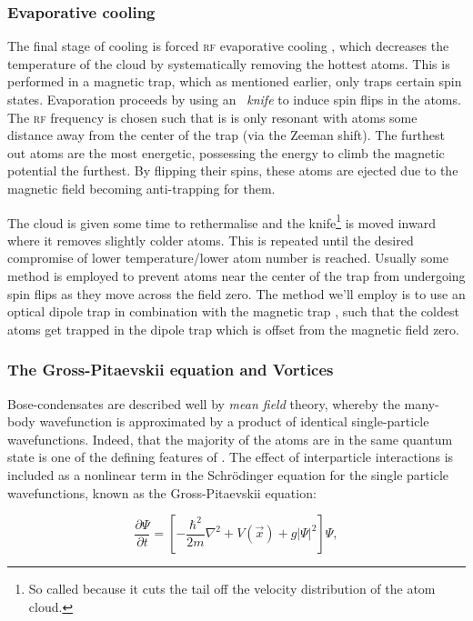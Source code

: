 \subsubsection{Evaporative cooling}

The final stage of cooling is forced \textsc{rf} evaporative cooling \cite{hess_evaporative_1986, anderson_observation_1995}, which decreases the temperature of the cloud by systematically removing the hottest atoms. This is performed in a magnetic trap, which as mentioned earlier, only traps certain spin states. Evaporation proceeds by using an \emph{\rf\ knife} to induce spin flips in the atoms. The \textsc{rf} frequency is chosen such that is is only resonant with atoms some distance away from the center of the trap (via the Zeeman shift). The furthest out atoms are the most energetic, possessing the energy to climb the magnetic potential the furthest. By flipping their spins, these atoms are ejected due to the magnetic field becoming anti-trapping for them.

The cloud is given some time to rethermalise and the knife\footnote{So called because it cuts the tail off the velocity distribution of the atom cloud.} is moved inward where it removes slightly colder atoms. This is repeated until the desired compromise of lower temperature/lower atom number is reached. Usually some method is employed to prevent atoms near the center of the trap from undergoing spin flips \cite{brink_majorana_2006} as they move across the field zero. The method we'll employ is to use an optical dipole trap in combination with the magnetic trap \cite{lin_rapid_2009}, such that the coldest atoms get trapped in the dipole trap which is offset from the magnetic field zero.

\subsubsection{The Gross-Pitaevskii equation and Vortices}

Bose-condensates are described well by \emph{mean field} theory, whereby the many-body wavefunction is approximated by a product of identical single-particle wavefunctions. Indeed, that the majority of the atoms are in the same quantum state is one of the defining features of \bec. The effect of interparticle interactions is included as a nonlinear term in the Schr\"odinger equation for the single particle wavefunctions, known as the Gross-Pitaevskii equation:

\begin{equation}
\frac{\partial \Psi}{\partial t} = \left[-\frac{\hbar^2}{2m}\nabla^2 + V(\vec{x}) + g|\Psi|^2\right]\Psi,
\end{equation}


